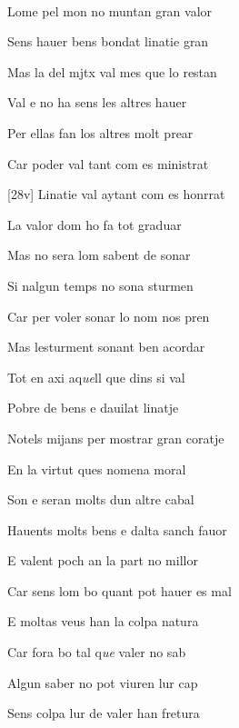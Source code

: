 \documentclass[12pt]{article}
\renewcommand{\espaiAbansEtiquetaPoema}{\vspace{0ex}}
\begin{document}
\begin{estrofa}

\espaiAbansEtiquetaPoema

\\

\end{estrofa}


\begin{estrofa}

 Lome pel mon no muntan gran valor

 Sens hauer bens bondat linatie gran

 Mas la del mjtx val mes que lo restan

 Val e no ha sens les altres hauer

 Per ellas fan los altres molt prear

 Car poder val tant com es ministrat

 [28v] Linatie val aytant com es honrrat

 La valor dom ho fa tot graduar

\end{estrofa}



\begin{estrofa}

 Mas no sera lom sabent de sonar

 Si nalgun temps no sona sturmen

 Car per voler sonar lo nom nos pren

 Mas lesturment sonant ben acordar

 Tot en axi aq\textit{ue}ll que dins si val

 Pobre de bens e dauilat linatje

 Notels mijans per mostrar gran coratje

 En la virtut ques nomena moral

\end{estrofa}



\begin{estrofa}

 Son e seran molts dun altre cabal

 Hauents molts bens e dalta sanch fauor

 E valent poch an la part no millor

 Car sens lom bo quant pot hauer es mal

 E moltas veus han la colpa natura

 Car fora bo tal q\textit{ue} valer no sab

 Algun saber no pot viuren lur cap

 Sens colpa lur de valer han fretura

\end{estrofa}
\end{document}
